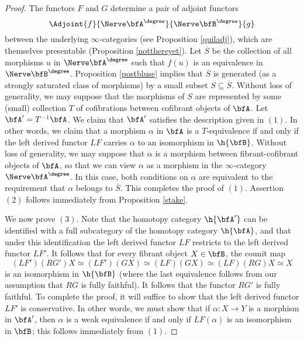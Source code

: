 \begin{proof}
The functors $F$ and $G$ determine a pair of adjoint functors 
$$ \Adjoint{f}{\Nerve \bfA^{\degree}}{\Nerve \bfB^{\degree}}{g}$$
between the underlying $\infty$-categories (see Proposition \ref{quiladj}), which
are themselves presentable (Proposition \ref{notthereyet}). Let $\overline{S}$
be the collection of all morphisms $u$ in $\Nerve \bfA^{\degree}$ such that
$f(u)$ is an equivalence in $\Nerve \bfB^{\degree}$. Proposition \ref{postbluse}
implies that $\overline{S}$ is generated (as a strongly saturated class of morphisms)
by a small subset $S \subseteq \overline{S}$. Without loss of generality, we may suppose
that the morphisms of $S$ are represented by some (small) collection $T$ of cofibrations between cofibrant objects of $\bfA$. Let $\bfA' = T^{-1} \bfA$. We claim that $\bfA'$ satisfies
the description given in $(1)$. In other words, we claim that a morphism
$\alpha$ in $\bfA$ is a $T$-equivalence if and only if the left derived functor
$LF$ carries $\alpha$ to an isomorphism in $\h{\bfB}$. Without loss of generality, we may suppose
that $\alpha$ is a morphism between fibrant-cofibrant objects of $\bfA$, so that we can
view $\alpha$ as a morphism in the $\infty$-category $\Nerve \bfA^{\degree}$. In this case, both conditions on $\alpha$ are equivalent to the requirement that $\alpha$ belongs to $\overline{S}$.
This completes the proof of $(1)$. Assertion $(2)$ follows immediately from Proposition \ref{stake}.

We now prove $(3)$. Note that the homotopy category $\h{\bfA'}$ can be identified with a full subcategory of the homotopy category $\h{\bfA}$, and that under this identification the left derived functor $LF$ restricts to the left derived functor $LF'$. It follows that for every fibrant object
$X \in \bfB$, the counit map
$$ (LF')(RG')X \simeq (LF')(GX)
\simeq (LF)(GX) \simeq (LF)(RG)X \simeq X$$
is an isomorphism in $\h{\bfB}$ (where the last equivalence follows from our assumption that $RG$
is fully faithful). It follows that the functor $RG'$ is fully faithful. To complete the proof, it will suffice to show that the left derived functor $LF'$ is conservative. In other words, we must show that
if $\alpha: X \rightarrow Y$ is a morphism in $\bfA'$, then $\alpha$ is a weak equivalence if and only if
$LF(\alpha)$ is an isomorphism in $\bfB$; this follows immediately from $(1)$.
\end{proof}


